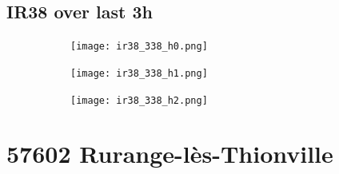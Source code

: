 \documentclass{article}
\begin{document}
\vspace{-1em}
\subsection*{IR38 over last 3h}
\vspace{-1em}
\begin{figure}[H]
    \centering
    \begin{subfigure}[b]{0.32\textwidth}
        \centering
        \texttt{[image: ir38\_338\_h0.png]} %
    \end{subfigure}
    \begin{subfigure}[b]{0.32\textwidth}
        \centering
        \texttt{[image: ir38\_338\_h1.png]} %
    \end{subfigure}
    \begin{subfigure}[b]{0.32\textwidth}
        \centering
        \texttt{[image: ir38\_338\_h2.png]} %
    \end{subfigure}
\end{figure}

\vspace{-1em}
\section*{57602 Rurange-lès-Thionville}
\vspace{-1em}
\end{document}

